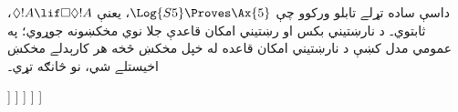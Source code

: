 \documentclass[../../../include/open-logic-section]{subfiles}
\begin{document}
\begin{ex}
  داسې ساده تړلے تابلو ورکوو چې $\Log{S5} \Proves \Ax{5}$،
  يعنې $\Diamond!A \lif \Box\Diamond!A$، ثابتوي۔ د نارښتيني
  بکس او رښتيني امکان قاعدې جلا نوي مخکښونه جوړوي؛ په عمومي
  مدل کښې د نارښتيني امکان قاعده له خپل مخکښ څخه هر کارېدلے
  مخکښ اخيستلے شي، نو څانګه تړي۔
  \begin{oltableau}
    [\pFmla{\False}{\Diamond\formula{A} \lif \Box\Diamond \formula{A}}{1},
      just = \TAss
      [\pFmla{\True}{\Diamond \formula{A}}{1}, just = {\TRule{\False}{\lif}[1]}
        [\pFmla{\False}{\Box\Diamond \formula{A}}{1},
          just = {\TRule{\False}{\lif}[1]}
          [\pFmla{\False}{\Diamond \formula{A}}{2},
            just = {\TRule{\False}{\Box}[3]}
            [\pFmla{\True}{\formula{A}}{3},
              just = {\TRule{\True}{\Diamond}[2]}
                [\pFmla{\False}{\formula{A}}{3},
                  just = {\TRule{\False}{\Diamond}[4]}, close]
            ]
          ]
        ]
      ]
    ]
  \end{oltableau}
\end{ex}
\end{document}
